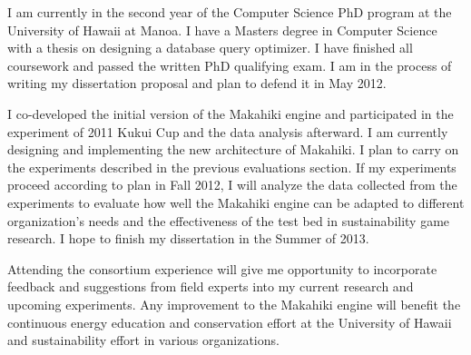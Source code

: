 \documentclass{acm_proc_article-sp}
\begin{document}
I am currently in the second year of the Computer Science PhD program at the University of Hawaii at Manoa. I have a Masters degree in Computer Science with a thesis on designing a database query optimizer. I have finished all coursework and passed the written PhD qualifying exam.  I am in the process of writing my dissertation proposal and plan to defend it in May 2012.

I co-developed the initial version of the Makahiki engine and participated in the experiment of 2011 Kukui Cup and the data analysis afterward. I  am currently designing and implementing the new architecture of Makahiki. I plan to carry on the experiments described in the previous evaluations section. If my experiments proceed according to plan in Fall 2012, I will analyze the data collected from the experiments to evaluate how well the Makahiki engine can be adapted to different organization's needs and the effectiveness of the test bed in sustainability game research. I hope to finish my dissertation in the Summer of 2013. 

Attending the consortium experience will give me opportunity to incorporate feedback and suggestions from field experts into my current research and upcoming experiments. Any improvement to the Makahiki engine will benefit the continuous energy education and conservation effort at the University of Hawaii and sustainability effort in various organizations.


  

\balancecolumns
\end{document}
